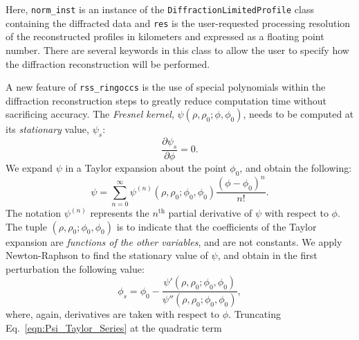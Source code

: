 \documentclass[titlepage, 12pt]{article}
\begin{document}
            Here, \texttt{norm\_inst} is an instance of the
            \texttt{DiffractionLimitedProfile} class containing the diffracted
            data and \texttt{res} is the user-requested processing
            resolution of the reconstructed profiles in kilometers
            and expressed as a floating point number.
            There are several keywords in this class to allow 
            the user to specify how the diffraction
            reconstruction will be performed.
            \par\hfill\par
            A new feature of \texttt{rss\_ringoccs} is the use of
            special polynomials within the diffraction reconstruction
            steps to greatly reduce computation time without
            sacrificing accuracy. The \textit{Fresnel kernel},
            $\psi(\rho,\rho_{0};\phi,\phi_{0})$, needs to be computed at its
            \textit{stationary} value, $\psi_{s}$:
            \begin{equation}
                \frac{\partial\psi_{s}}{\partial\phi}=0.
            \end{equation}
            We expand $\psi$ in a Taylor expansion about the point
            $\phi_{0}$, and obtain the following:
            \begin{equation}
                \label{eqn:Psi_Taylor_Series}
                \psi=
                    \sum_{n=0}^{\infty}
                    \psi^{(n)}(\rho,\rho_{0};\phi_{0},\phi_{0})
                    \frac{(\phi-\phi_{0})^{n}}{n!}.
            \end{equation}
            The notation $\psi^{(n)}$ represents the
            $n^{\textrm{th}}$ partial derivative of $\psi$ with
            respect to $\phi$. The tuple
            $(\rho,\rho_{0};\phi_{0},\phi_{0})$ is to indicate that
            the coefficients of the Taylor expansion are
            \textit{functions of the other variables},
            and are not constants. We apply Newton-Raphson to find
            the stationary value of $\psi$, and obtain in the first
            perturbation the following value:
            \begin{equation}
                \phi_{s}=
                    \phi_{0}-\frac{\psi'(\rho,\rho_{0};\phi_{0},\phi_{0})}
                                  {\psi''(\rho,\rho_{0};\phi_{0},\phi_{0})},
            \end{equation}
            where, again, derivatives are taken with respect to $\phi$.
            Truncating Eq.~\ref{eqn:Psi_Taylor_Series} at the quadratic term
\end{document}

